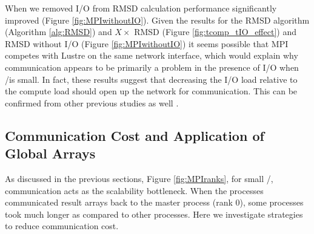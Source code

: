When we removed I/O from RMSD calculation performance significantly improved (Figure \ref{fig:MPIwithoutIO}).
Given the results for the RMSD algorithm (Algorithm \ref{alg:RMSD}) and $X\times$ RMSD (Figure \ref{fig:tcomp_tIO_effect}) and RMSD without I/O (Figure \ref{fig:MPIwithoutIO})
it seems possible that MPI competes with Lustre on the same network interface, which would explain why communication appears to
be primarily a problem in the presence of I/O when \tcomp/\tIO is small.
In fact, these results suggest that decreasing the I/O load relative to the compute load should open up the network for communication.
This can be confirmed from other previous studies as well \cite{VMD2013, Kevin2018}. 

\subsection{Communication Cost and Application of Global Arrays}
\label{Global-Array}
As discussed in the previous sections, Figure \ref{fig:MPIranks}, for small \tcomp/\tIO, communication acts as the scalability bottleneck. 
When the processes communicated result arrays back to the master process (rank 0), some processes took much longer as compared to other processes. 
Here we investigate strategies to reduce communication cost. 

